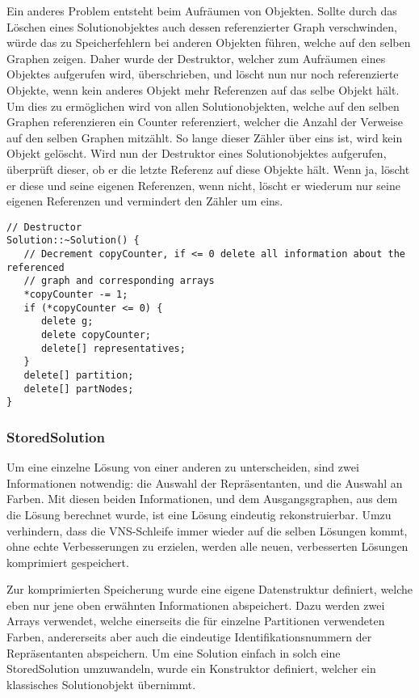Ein anderes Problem entsteht beim Aufräumen von Objekten. Sollte durch das Löschen eines Solutionobjektes auch dessen referenzierter Graph verschwinden, würde das zu Speicherfehlern bei anderen Objekten führen, 
welche auf den selben Graphen zeigen. Daher wurde der Destruktor, welcher zum Aufräumen eines Objektes aufgerufen wird, überschrieben, und löscht nun nur noch referenzierte Objekte, wenn kein anderes Objekt
mehr Referenzen auf das selbe Objekt hält. Um dies zu ermöglichen wird von allen Solutionobjekten, welche auf den selben Graphen referenzieren ein Counter referenziert, welcher die Anzahl der
Verweise auf den selben Graphen mitzählt. So lange dieser Zähler über eins ist, wird kein Objekt gelöscht. Wird nun der Destruktor eines Solutionobjektes aufgerufen, überprüft dieser, ob er die letzte
Referenz auf diese Objekte hält. Wenn ja, löscht er diese und seine eigenen Referenzen, wenn nicht, löscht er wiederum nur seine eigenen Referenzen und vermindert den Zähler um eins.

\begin{lstlisting}[caption={Der Destruktor der Solutionklasse mit Rücksichtnahme auf eventuelle verbleibende Referenzen},label={lst:destruct}]
// Destructor
Solution::~Solution() {
   // Decrement copyCounter, if <= 0 delete all information about the referenced
   // graph and corresponding arrays
   *copyCounter -= 1;
   if (*copyCounter <= 0) {
      delete g;
      delete copyCounter;
      delete[] representatives;
   }
   delete[] partition;
   delete[] partNodes;
}
\end{lstlisting}

\subsubsection{StoredSolution}
Um eine einzelne Lösung von einer anderen zu unterscheiden, sind zwei Informationen notwendig: die Auswahl der Repräsentanten, und die Auswahl 
an Farben. Mit diesen beiden Informationen, und dem Ausgangsgraphen, aus dem die Lösung berechnet wurde, ist eine Lösung eindeutig rekonstruierbar.
Umzu verhindern, dass die VNS-Schleife immer wieder auf die selben Lösungen kommt, ohne echte Verbesserungen zu erzielen, werden alle neuen, verbesserten
Lösungen komprimiert gespeichert. 

Zur komprimierten Speicherung wurde eine eigene Datenstruktur definiert, welche eben nur jene oben erwähnten Informationen abspeichert. 
Dazu werden zwei Arrays verwendet, welche einerseits die für einzelne Partitionen verwendeten Farben, andererseits aber auch die 
eindeutige Identifikationsnummern der Repräsentanten abspeichern. Um eine Solution einfach in solch eine StoredSolution umzuwandeln, wurde
ein Konstruktor definiert, welcher ein klassisches Solutionobjekt übernimmt. 

